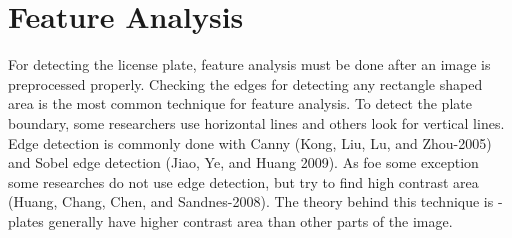 \section{Feature Analysis}

For detecting the license plate, feature analysis must be done after an image is preprocessed properly.
Checking the edges for detecting any rectangle shaped area is the most common technique for feature analysis.
To detect the plate boundary, some researchers use horizontal lines and others look for vertical lines.
Edge detection is commonly done with Canny (Kong, Liu, Lu, and Zhou-2005) and Sobel edge detection (Jiao, Ye, and Huang 2009).
As foe some exception some researches do not use edge detection, but try to find high contrast area (Huang, Chang, Chen, and Sandnes-2008). The theory behind this technique is - plates generally have higher contrast area than other parts of the image.